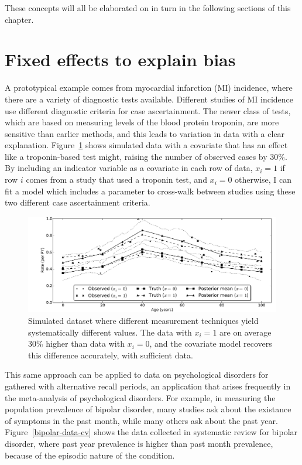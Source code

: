 These concepts will all be elaborated on in turn in the following
sections of this chapter.

\section{Fixed effects to explain bias}

A prototypical example comes from myocardial infarction (MI)
incidence, where there are a variety of diagnostic tests available.
Different studies of MI incidence use different diagnostic criteria
for case ascertainment.  The newer class of tests, which are based on
measuring levels of the blood protein troponin, are more sensitive
than earlier methods, and this leads to variation in data with a clear
explanation.  Figure~\ref{cov-sim} shows simulated data with a
covariate that has an effect like a troponin-based test might, raising
the number of observed cases by 30\%. By including an indicator
variable as a covariate in each row of data, $x_i = 1$ if row $i$
comes from a study that used a troponin test, and $x_i = 0$ otherwise,
I can fit a model which includes a parameter to cross-walk between
studies using these two different case ascertainment criteria.

\begin{figure}[h]
\begin{center}
\includegraphics[width=\textwidth]{cov_fe.pdf}
\caption{Simulated dataset where different measurement techniques
  yield systematically different values. The data with $x_i=1$ are on
  average 30\% higher than data with $x_i=0$, and the covariate model
  recovers this difference accurately, with sufficient data.}
\label{cov-sim}
\end{center}
\end{figure}

This same approach can be applied to data on psychological disorders for gathered with alternative
recall periods, an application that arises frequently in the
meta-analysis of psychological disorders.  For example, in measuring
the population prevalence of bipolar disorder, many studies ask about
the existance of symptoms in the past month, while many others ask
about the past year.  Figure~\ref{bipolar-data-cv} shows the data
collected in systematic review for bipolar disorder, where past year
prevalence is higher than past month prevalence, because of the
episodic nature of the condition.

